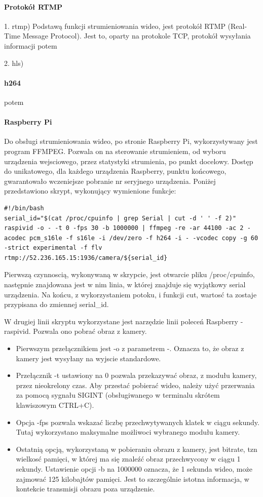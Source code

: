 \paragraph{Protokół RTMP}
1. rtmp) Podstawą funkcji strumieniowania wideo, jest protokół RTMP (Real-Time Message Protocol). Jest to, oparty na protokole TCP, protokół wysyłania informacji 
potem

2. hls)

\paragraph{h264}
potem

\paragraph{Raspberry Pi}

Do obsługi strumieniowania wideo, po stronie Raspberry Pi, wykorzystywany jest program FFMPEG. Pozwala on na sterowanie strumieniem, od wyboru urządzenia wejsciowego, przez statystyki strumienia, po punkt docelowy. Dostęp do unikatowego, dla każdego urządzenia Raspberry, punktu końcowego, gwarantowało wczeniejsze pobranie nr seryjnego urządzenia. Poniżej przedstawiono skrypt, wykonujący wymienione funkcje:
\begin{verbatim}
#!/bin/bash
serial_id="$(cat /proc/cpuinfo | grep Serial | cut -d ' ' -f 2)"
raspivid -o - -t 0 -fps 30 -b 1000000 | ffmpeg -re -ar 44100 -ac 2 -acodec pcm_s16le -f s16le -i /dev/zero -f h264 -i - -vcodec copy -g 60 -strict experimental -f flv rtmp://52.236.165.15:1936/camera/${serial_id}
\end{verbatim}

Pierwszą czynnoscią, wykonywaną w skrypcie, jest otwarcie pliku /proc/cpuinfo, następnie znajdowana jest w nim linia, w której znajduje się wyjątkowy serial urządzenia. Na końcu, z wykorzystaniem potoku, i funkcji cut, wartosć ta zostaje przypisana do zmiennej serial_id.

W drugiej linii skryptu wykorzystane jest narzędzie linii poleceń Raspberry - raspivid. Pozwala ono pobrać obraz z kamery. 
\begin{itemize}
\item Pierwszym przełącznikiem jest -o z parametrem -. Oznacza to, że obraz z kamery jest wysyłany na wyjscie standardowe.
\item Przełącznik -t ustawiony na 0 pozwala przekazywać obraz, z modułu kamery, przez nieokrelony czas. Aby przestać pobierać wideo, należy użyć przerwania za pomocą sygnału SIGINT (obsługiwanego w terminalu skrótem klawiszowym CTRL+C).
\item Opcja -fps pozwala wskazać liczbę przechwytywanych klatek w ciągu sekundy. Tutaj wykorzystano maksymalne możliwoci wybranego modułu kamery.
\item Ostatnią opcją, wykorzystaną w pobieraniu obrazu z kamery, jest bitrate, tzn wielkosć pamięci, w której ma się znaleźć obraz przechwycony w ciągu 1 sekundy. Ustawienie opcji -b na 1000000 oznacza, że 1 sekunda wideo, może zajmować 125 kilobajtów pamięci. Jest to szczególnie istotna informacja, w kontekcie transmisji obrazu poza urządzenie.
\end{itemize}

